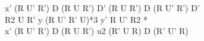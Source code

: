 x' (R U' R') D (R U R') D' (R U R') D (R U' R') D'\\
R2 U R' y (R U' R' U)*3 y' R U' R2 *\\
x' (R U' R') D (R U R') u2 (R' U R) D (R' U' R)\\
